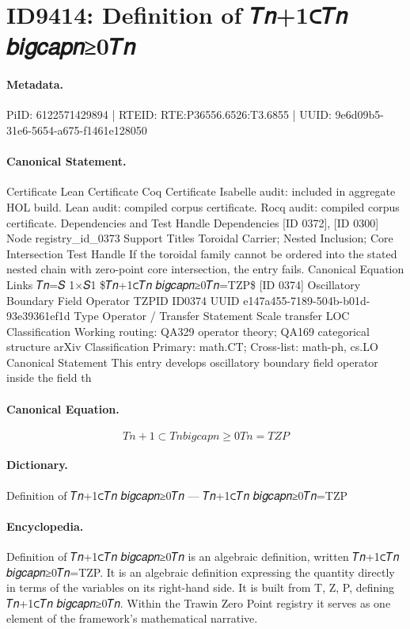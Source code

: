 \section*{ID9414: Definition of 𝑇𝑛+1⊂𝑇𝑛 𝑏𝑖𝑔𝑐𝑎𝑝𝑛≥0𝑇𝑛}
\paragraph{Metadata.}
PiID: 6122571429894 | RTEID: RTE:P36556.6526:T3.6855 | UUID: 9e6d09b5-31e6-5654-a675-f1461e128050

\paragraph{Canonical Statement.}
Certificate Lean Certificate Coq Certificate Isabelle audit: included in aggregate HOL build. Lean audit: compiled corpus certificate. Rocq audit: compiled corpus certificate. Dependencies and Test Handle Dependencies [ID 0372], [ID 0300] Node registry\_id\_0373 Support Titles Toroidal Carrier; Nested Inclusion; Core Intersection Test Handle If the toroidal family cannot be ordered into the stated nested chain with zero-point core intersection, the entry fails. Canonical Equation Links 𝑇𝑛=𝑆 1×𝑆1 \$𝑇𝑛+1⊂𝑇𝑛 𝑏𝑖𝑔𝑐𝑎𝑝𝑛≥0𝑇𝑛=TZP\$ [ID 0374] Oscillatory Boundary Field Operator TZPID ID0374 UUID e147a455-7189-504b-b01d-93e39361ef1d Type Operator / Transfer Statement Scale transfer LOC Classification Working routing: QA329 operator theory; QA169 categorical structure arXiv Classification Primary: math.CT; Cross-list: math-ph, cs.LO Canonical Statement This entry develops oscillatory boundary field operator inside the field th

\paragraph{Canonical Equation.}
\[
𝑇𝑛+1⊂𝑇𝑛 𝑏𝑖𝑔𝑐𝑎𝑝𝑛≥0𝑇𝑛=TZP
\]

\paragraph{Dictionary.}
Definition of 𝑇𝑛+1⊂𝑇𝑛 𝑏𝑖𝑔𝑐𝑎𝑝𝑛≥0𝑇𝑛 — 𝑇𝑛+1⊂𝑇𝑛 𝑏𝑖𝑔𝑐𝑎𝑝𝑛≥0𝑇𝑛=TZP

\paragraph{Encyclopedia.}
Definition of 𝑇𝑛+1⊂𝑇𝑛 𝑏𝑖𝑔𝑐𝑎𝑝𝑛≥0𝑇𝑛 is an algebraic definition, written 𝑇𝑛+1⊂𝑇𝑛 𝑏𝑖𝑔𝑐𝑎𝑝𝑛≥0𝑇𝑛=TZP. It is an algebraic definition expressing the quantity directly in terms of the variables on its right-hand side. It is built from T, Z, P, defining 𝑇𝑛+1⊂𝑇𝑛 𝑏𝑖𝑔𝑐𝑎𝑝𝑛≥0𝑇𝑛. Within the Trawin Zero Point registry it serves as one element of the framework's mathematical narrative.
